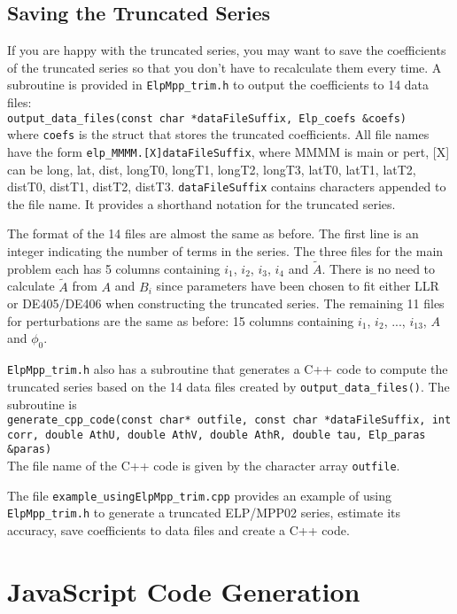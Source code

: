 \documentclass[12pt]{article}
\begin{document}
\subsection{Saving the Truncated Series}

If you are happy with the truncated series, you may want to save the coefficients 
of the truncated series so that you don't have to recalculate them every time. 
A subroutine is provided in {\tt ElpMpp\_trim.h} to output the coefficients 
to 14 data files: \\
{\tt output\_data\_files(const char *dataFileSuffix, Elp\_coefs \&coefs)} \\
where {\tt coefs} is the struct that stores the truncated coefficients. All 
file names have the form {\tt elp\_MMMM.[X]dataFileSuffix}, where MMMM is 
main or pert, [X] can be long, lat, dist, longT0, longT1, longT2, longT3, 
latT0, latT1, latT2, distT0, distT1, distT2, distT3. {\tt dataFileSuffix} contains 
characters appended to the file name. It provides a shorthand notation
for the truncated series.

The format of the 14 files are almost the same as before. The first line is 
an integer indicating the number of terms in the series. The three files for the 
main problem each has 5 columns containing $i_1$, $i_2$, $i_3$, $i_4$ and 
$\tilde{A}$. There is no need to calculate $\tilde{A}$ from $A$ and $B_i$ since 
parameters have been chosen to fit either LLR or DE405/DE406 when constructing 
the truncated series. The remaining 11 files for perturbations are the same 
as before: 15 columns containing $i_1$, $i_2$, ..., $i_{13}$, $A$ and $\phi_0$. 

{\tt ElpMpp\_trim.h} also has a subroutine that generates a C++ code to compute 
the truncated series based on the 14 data files created by {\tt output\_data\_files()}. 
The subroutine is \\
{\tt generate\_cpp\_code(const char* outfile, const char *dataFileSuffix, int corr,
                       double AthU, double AthV, double AthR, double tau,
                       Elp\_paras \&paras)} \\
The file name of the C++ code is given by the character array {\tt outfile}. 

The file {\tt example\_usingElpMpp\_trim.cpp} provides an example of 
using {\tt ElpMpp\_trim.h} to generate a truncated ELP/MPP02 series, 
estimate its accuracy, save coefficients to data files and create a C++ code.

\section{JavaScript Code Generation}
\end{document}
